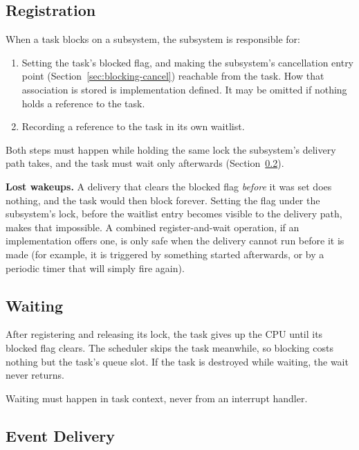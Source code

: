\documentclass[11pt]{article}
\begin{document}
\subsection{Registration}
\label{sec:blocking-registration}

When a task blocks on a subsystem, the subsystem is responsible for:

\begin{enumerate}
	\item Setting the task's blocked flag, and making the subsystem's cancellation entry point (Section~\ref{sec:blocking-cancel}) reachable from the task. How that association is stored is implementation defined. It may be omitted if nothing holds a reference to the task.
	\item Recording a reference to the task in its own waitlist.
\end{enumerate}

Both steps must happen while holding the same lock the subsystem's delivery path takes, and the task must wait only afterwards (Section~\ref{sec:blocking-waiting}).

\begin{specnote}
	\textbf{Lost wakeups.} A delivery that clears the blocked flag \textit{before} it was set does nothing, and the task would then block forever.
	Setting the flag under the subsystem's lock, before the waitlist entry becomes visible to the delivery path, makes that impossible.
	A combined register-and-wait operation, if an implementation offers one, is only safe when the delivery cannot run before it is made (for example, it is triggered by something started afterwards, or by a periodic timer that will simply fire again).
\end{specnote}

\subsection{Waiting}
\label{sec:blocking-waiting}

After registering and releasing its lock, the task gives up the CPU until its blocked flag clears.
The scheduler skips the task meanwhile, so blocking costs nothing but the task's queue slot.
If the task is destroyed while waiting, the wait never returns.

Waiting must happen in task context, never from an interrupt handler.

\subsection{Event Delivery}
\end{document}
